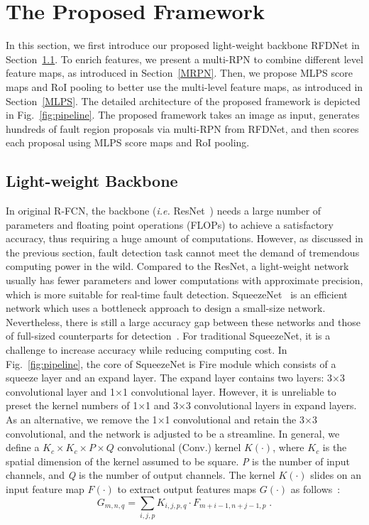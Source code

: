 \section{The Proposed Framework}
\label{method}
In this section, we first introduce our proposed light-weight backbone RFDNet in Section~\ref{sec:DS-SqueezeNet}. To enrich features, we present a multi-RPN to combine different level feature maps, as introduced in Section~\ref{MRPN}. Then, we propose MLPS score maps and RoI pooling to better use the multi-level feature maps, as introduced in Section~\ref{MLPS}. The detailed architecture of the proposed framework is depicted in Fig.~\ref{fig:pipeline}. The proposed framework takes an image as input, generates hundreds of fault region proposals via multi-RPN from RFDNet, and then scores each proposal using MLPS score maps and RoI pooling.

\subsection{Light-weight Backbone}
\label{sec:DS-SqueezeNet}
In original R-FCN, the backbone (\textit{i.e.} ResNet~\cite{He2016Deep}) needs a large number of parameters and floating point operations (FLOPs) to achieve a satisfactory accuracy, thus requiring a huge amount of computations. However, as discussed in the previous section, fault detection task cannot meet the demand of tremendous computing power in the wild. Compared to the ResNet, a light-weight network usually has fewer parameters and lower computations with approximate precision, which is more suitable for real-time fault detection. SqueezeNet~\cite{iandola2016squeezenet} is an efficient network which uses a bottleneck approach to design a small-size network. Nevertheless, there is still a large accuracy gap between these networks and those of full-sized counterparts for detection~\cite{yuxi2018tinydsod}. For traditional SqueezeNet, it is a challenge to increase accuracy while reducing computing cost. In Fig.~\ref{fig:pipeline}, the core of SqueezeNet is Fire module which consists of a squeeze layer and an expand layer. The expand layer contains two layers: 3$\times$3 convolutional layer and 1$\times$1 convolutional layer. However, it is unreliable to preset the kernel numbers of 1$\times$1 and 3$\times$3 convolutional layers in expand layers. As an alternative, we remove the 1$\times$1 convolutional and retain the 3$\times$3 convolutional, and the network is adjusted to be a streamline.
In general, we define a $K_c\times K_c\times P\times Q$ convolutional (Conv.) kernel $K(\cdot)$, where $K_c$ is the spatial dimension of the kernel assumed to be square. \textit{P} is the number of input channels, and \textit{Q} is the number of output channels. The kernel $K(\cdot)$ slides on an input feature map $F(\cdot)$ to extract output features maps $G(\cdot)$ as follows~\cite{sandler2018inverted}:
\begin{equation}
G_{m, n, q}=\sum_{i,j,p}K_{i, j, p, q}\cdot F_{m+i-1, n+j-1, p} \;.
\end{equation}

